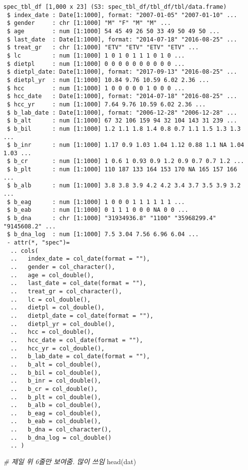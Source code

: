 \documentclass[
]{article}
\newenvironment{Shaded}{\begin{snugshade}}{\end{snugshade}}
\newcommand{\CommentTok}[1]{\textcolor[rgb]{0.56,0.35,0.01}{\textit{#1}}}
\newcommand{\FunctionTok}[1]{\textcolor[rgb]{0.00,0.00,0.00}{#1}}
\newcommand{\NormalTok}[1]{#1}
\begin{document}
\begin{verbatim}
spec_tbl_df [1,000 x 23] (S3: spec_tbl_df/tbl_df/tbl/data.frame)
 $ index_date : Date[1:1000], format: "2007-01-05" "2007-01-10" ...
 $ gender     : chr [1:1000] "M" "F" "M" "M" ...
 $ age        : num [1:1000] 54 45 49 26 50 33 49 50 49 50 ...
 $ last_date  : Date[1:1000], format: "2014-07-18" "2016-08-25" ...
 $ treat_gr   : chr [1:1000] "ETV" "ETV" "ETV" "ETV" ...
 $ lc         : num [1:1000] 1 0 1 0 1 1 1 0 1 0 ...
 $ dietpl     : num [1:1000] 0 0 0 0 0 0 0 0 0 0 ...
 $ dietpl_date: Date[1:1000], format: "2017-09-13" "2016-08-25" ...
 $ dietpl_yr  : num [1:1000] 10.84 9.76 10.59 6.02 2.36 ...
 $ hcc        : num [1:1000] 1 0 0 0 0 0 1 0 0 0 ...
 $ hcc_date   : Date[1:1000], format: "2014-07-18" "2016-08-25" ...
 $ hcc_yr     : num [1:1000] 7.64 9.76 10.59 6.02 2.36 ...
 $ b_lab_date : Date[1:1000], format: "2006-12-28" "2006-12-28" ...
 $ b_alt      : num [1:1000] 67 32 106 159 94 32 104 143 31 239 ...
 $ b_bil      : num [1:1000] 1.2 1.1 1.8 1.4 0.8 0.7 1.1 1.5 1.3 1.3 ...
 $ b_inr      : num [1:1000] 1.17 0.9 1.03 1.04 1.12 0.88 1.1 NA 1.04 1.03 ...
 $ b_cr       : num [1:1000] 1 0.6 1 0.93 0.9 1.2 0.9 0.7 0.7 1.2 ...
 $ b_plt      : num [1:1000] 110 187 133 164 153 170 NA 165 157 166 ...
 $ b_alb      : num [1:1000] 3.8 3.8 3.9 4.2 4.2 3.4 3.7 3.5 3.9 3.2 ...
 $ b_eag      : num [1:1000] 1 0 0 0 1 1 1 1 1 1 ...
 $ b_eab      : num [1:1000] 0 1 1 1 0 0 0 NA 0 0 ...
 $ b_dna      : chr [1:1000] "31934936.8" "1100" "35968299.4" "9145608.2" ...
 $ b_dna_log  : num [1:1000] 7.5 3.04 7.56 6.96 6.04 ...
 - attr(*, "spec")=
  .. cols(
  ..   index_date = col_date(format = ""),
  ..   gender = col_character(),
  ..   age = col_double(),
  ..   last_date = col_date(format = ""),
  ..   treat_gr = col_character(),
  ..   lc = col_double(),
  ..   dietpl = col_double(),
  ..   dietpl_date = col_date(format = ""),
  ..   dietpl_yr = col_double(),
  ..   hcc = col_double(),
  ..   hcc_date = col_date(format = ""),
  ..   hcc_yr = col_double(),
  ..   b_lab_date = col_date(format = ""),
  ..   b_alt = col_double(),
  ..   b_bil = col_double(),
  ..   b_inr = col_double(),
  ..   b_cr = col_double(),
  ..   b_plt = col_double(),
  ..   b_alb = col_double(),
  ..   b_eag = col_double(),
  ..   b_eab = col_double(),
  ..   b_dna = col_character(),
  ..   b_dna_log = col_double()
  .. )
\end{verbatim}

\begin{Shaded}
\begin{Highlighting}[]
\CommentTok{\# 제일 위 6줄만 보여줌. 많이 쓰임}
\FunctionTok{head}\NormalTok{(dat)}
\end{Highlighting}
\end{Shaded}
\end{document}
